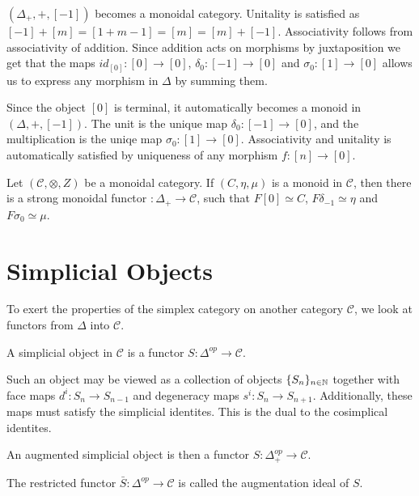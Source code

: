 \documentclass[../thesis.tex]{subfiles}
\begin{document}
        $(\Delta_+,+,[-1])$ becomes a monoidal category. Unitality is satisfied as $[-1]+[m] = [1+m-1] = [m] = [m] + [-1]$. Associativity follows from associativity of addition. Since addition acts on morphisms by juxtaposition we get that the maps $id_[0] : [0] \rightarrow [0]$, $\delta_0 : [-1] \rightarrow [0]$ and $\sigma_0 : [1] \rightarrow [0]$ allows us to express any morphism in $\Delta$ by summing them.

        Since the object $[0]$ is terminal, it automatically becomes a monoid in $(\Delta, +, [-1])$. The unit is the unique map $\delta_0 : [-1] \rightarrow [0]$, and the multiplication is the uniqe map $\sigma_0 : [1] \rightarrow [0]$. Associativity and unitality is automatically satisfied by uniqueness of any morphism $f:[n]\rightarrow [0]$.
        \begin{proposition}\label{prop: universal-monoid}
            Let $(\mathcal{C}, \otimes, Z)$ be a monoidal category. If $(C, \eta, \mu)$ is a monoid in $\mathcal{C}$, then there is a strong monoidal functor $:\Delta_+\rightarrow \mathcal{C}$, such that $F[0] \simeq C$, $F\delta_{-1} \simeq \eta$ and $F\sigma_0 \simeq \mu$.
        \end{proposition}


    \section{Simplicial Objects}
        To exert the properties of the simplex category on another category $\mathcal{C}$, we look at functors from $\Delta$ into $\mathcal{C}$. 
        
        \begin{definition}
            A simplicial object in $\mathcal{C}$ is a functor $S:\Delta^{op}\rightarrow \mathcal{C}$. 
        \end{definition}
        Such an object may be viewed as a collection of objects $\{S_n\}_{n\in\mathbb{N}}$ together with face maps $d^i:S_n\rightarrow S_{n-1}$ and degeneracy maps $s^i:S_n \rightarrow S_{n+1}$. Additionally, these maps must satisfy the simplicial identites. This is the dual to the cosimplical identites.
        
        \begin{definition}
            An augmented simplicial object is then a functor $S:\Delta_+^{op}\rightarrow \mathcal{C}$. 
            
            The restricted functor $\bar{S}:\Delta^{op}\rightarrow \mathcal{C}$ is called the augmentation ideal of $S$. 
        \end{definition}
\end{document}
